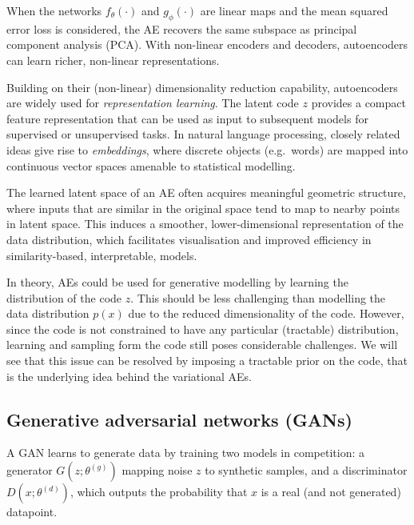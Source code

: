\begin{remark}
    When the networks $f_\theta(\cdot)$ and $g_\phi(\cdot)$ are linear maps and the mean squared error loss is considered, the AE recovers the same subspace as principal component analysis (PCA). With non-linear encoders and decoders, autoencoders can learn richer, non-linear representations.
\end{remark}



Building on their (non-linear) dimensionality reduction capability, autoencoders are widely used for \emph{representation learning}. The latent code $z$ provides a compact feature representation that can be used as input to subsequent models for supervised or unsupervised tasks. In natural language processing, closely related ideas give rise to \emph{embeddings}, where discrete objects (e.g.\ words) are mapped into continuous vector spaces amenable to statistical modelling.

\begin{remark}
The learned latent space of an AE  often acquires meaningful geometric structure, where inputs that are similar in the original space tend to map to nearby points in latent space. This induces a smoother, lower-dimensional representation of the data distribution, which facilitates visualisation and improved efficiency in similarity-based, interpretable, models.
\end{remark}

\begin{remark}
   In theory, AEs could be used for generative modelling by learning the distribution of the code $z$. This should be less challenging than modelling the data distribution $p(x)$ due to the reduced dimensionality of the code. However, since the code is not constrained to have any particular (tractable) distribution, learning and sampling form the code still poses considerable challenges. We will see that this issue can be resolved by imposing a tractable prior on the code, that is the underlying idea behind the variational AEs.
\end{remark}



\subsection{Generative adversarial networks (GANs)}

A GAN learns to generate data by training two models in competition: a generator $G(z;\theta^{(g)})$ mapping noise $z$ to synthetic samples, and a discriminator $D(x;\theta^{(d)})$, which outputs the probability that $x$ is a real (and not generated) datapoint.

